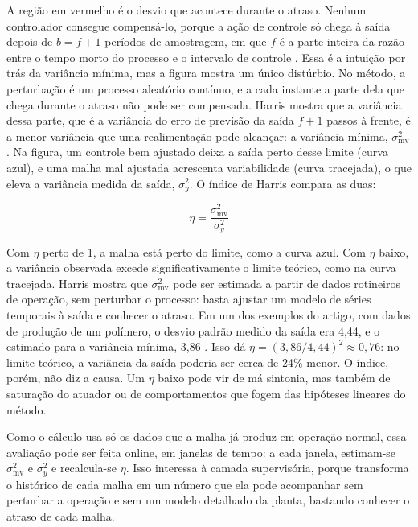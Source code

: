 A região em vermelho é o desvio que acontece durante o atraso. Nenhum controlador consegue compensá-lo, porque a ação de controle só chega à saída depois de $b = f + 1$ períodos de amostragem, em que $f$ é a parte inteira da razão entre o tempo morto do processo e o intervalo de controle \cite[Equação~2]{Harris1989}. Essa é a intuição por trás da variância mínima, mas a figura mostra um único distúrbio. No método, a perturbação é um processo aleatório contínuo, e a cada instante a parte dela que chega durante o atraso não pode ser compensada. Harris mostra que a variância dessa parte, que é a variância do erro de previsão da saída $f+1$ passos à frente, é a menor variância que uma realimentação pode alcançar: a variância mínima, $\sigma^2_{\text{mv}}$ \cite{Harris1989}. Na figura, um controle bem ajustado deixa a saída perto desse limite (curva azul), e uma malha mal ajustada acrescenta variabilidade (curva tracejada), o que eleva a variância medida da saída, $\sigma^2_y$. O índice de Harris compara as duas:

\begin{equation}
	\eta = \frac{\sigma^2_{\text{mv}}}{\sigma^2_y}
	\label{eq:harris_index}
\end{equation}

\noindent Com $\eta$ perto de 1, a malha está perto do limite, como a curva azul. Com $\eta$ baixo, a variância observada excede significativamente o limite teórico, como na curva tracejada. Harris mostra que $\sigma^2_{\text{mv}}$ pode ser estimada a partir de dados rotineiros de operação, sem perturbar o processo: basta ajustar um modelo de séries temporais à saída e conhecer o atraso. Em um dos exemplos do artigo, com dados de produção de um polímero, o desvio padrão medido da saída era 4,44, e o estimado para a variância mínima, 3,86 \cite{Harris1989}. Isso dá $\eta = (3{,}86/4{,}44)^2 \approx 0{,}76$: no limite teórico, a variância da saída poderia ser cerca de 24\% menor. O índice, porém, não diz a causa. Um $\eta$ baixo pode vir de má sintonia, mas também de saturação do atuador ou de comportamentos que fogem das hipóteses lineares do método.

Como o cálculo usa só os dados que a malha já produz em operação normal, essa avaliação pode ser feita online, em janelas de tempo: a cada janela, estimam-se $\sigma^2_{\text{mv}}$ e $\sigma^2_y$ e recalcula-se $\eta$. Isso interessa à camada supervisória, porque transforma o histórico de cada malha em um número que ela pode acompanhar sem perturbar a operação e sem um modelo detalhado da planta, bastando conhecer o atraso de cada malha.

